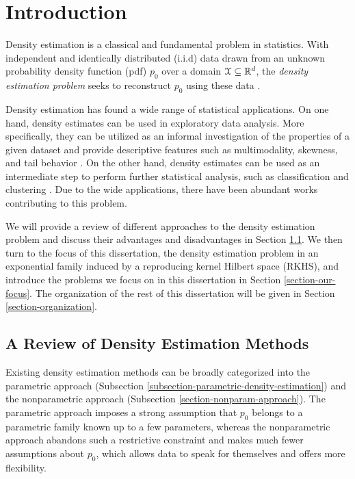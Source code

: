 \chapter{Introduction}
\label{ch1}


Density estimation is a classical and fundamental problem in statistics. With independent and identically distributed (i.i.d) data drawn from an unknown probability density function (pdf) $p_0$ over a domain $\mathcal{X} \subseteq \mathbb{R}^d$, the \emph{density estimation problem} seeks to reconstruct $p_0$ using these data \parencite{Silverman1986-mu}. 

Density estimation has found a wide range of statistical applications. On one hand, density estimates can be used in exploratory data analysis. More specifically, they can be utilized as an informal investigation of the properties of a given dataset and provide descriptive features such as multimodality, skewness, and tail behavior \parencite{Silverman1986-mu, Izenman2009-jk}. On the other hand, density estimates can be used as an intermediate step to perform further statistical analysis, such as classification \parencites{Ripley1996-bi} and clustering \parencites{Fukunaga1975-vy}. Due to the wide applications, there have been abundant works contributing to this problem. 

We will provide a review of different approaches to the density estimation problem and discuss their advantages and disadvantages in Section \ref{section-methods}. We then turn to the focus of this dissertation, the density estimation problem in an exponential family induced by a reproducing kernel Hilbert space (RKHS), and introduce the problems we focus on in this dissertation in Section \ref{section-our-focus}. The organization of the rest of this dissertation will be given in Section \ref{section-organization}. 

\section{A Review of Density Estimation Methods}\label{section-methods}

Existing density estimation methods can be broadly categorized into the parametric approach (Subsection \ref{subsection-parametric-density-estimation}) and the nonparametric approach (Subsection \ref{section-nonparam-approach}). The parametric approach imposes a strong assumption that $p_0$ belongs to a parametric family known up to a few parameters, %
whereas the nonparametric approach abandons such a restrictive constraint and makes much fewer assumptions about $p_0$, which allows data to speak for themselves and offers more flexibility. 

